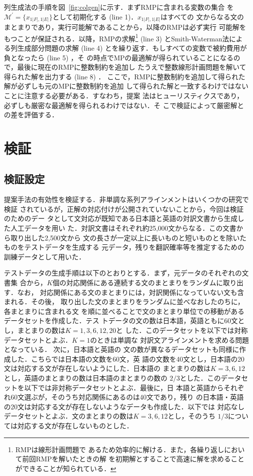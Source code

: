 \documentclass[japanese]{jnlp_1.4}
\begin{document}
列生成法の手順を図~\ref{fig:colgen}に示す．まずRMPに含まれる変数の集合
を$\mathcal{M}^{\prime} = \{x_{1|F|,1|E|}\}$として初期化する (line 1)．$x_{1|F|,1|E|}$はすべての
文からなる文のまとまりであり，実行可能解であることから，以降のRMPは必ず実行
可能解をもつことが保証される．以降，RMPの求解\footnote{RMPは線形計画問題で
あるため効率的に解ける．また，各繰り返しにおいて前回RMPを解いたときの解
を初期解とすることで高速に解を求めることができることが知られている．} (line 3)
とSmith-Waterman法による列生成部分問題の求解 (line 4) 
とを繰り返す．もしすべての変数で被約費用が負となったら (line 5) ，そ
の時点でMPの最適解が得られていることになるので，最後に現在のRMPに整数制約を追加し
たうえで整数線形計画問題を解いて得られた解を出力する (line 8) ．
ここで，RMPに整数制約を追加して得られた解が必ずしも元のMPに整数制約を追加
して得られた解と一致するわけではないことに注意する必要がある．すなわち，提案
法はヒューリスティクスであり，必ずしも厳密な最適解を得られるわけではない．そ
こで検証によって厳密解との差を評価する．


\section{検証}

\subsection{検証設定}

提案手法の有効性を検証する．非単調な系列アラインメントはいくつかの研究で検証
されているが，正解の対応付けが公開されていないことから，今回は検証のためのデー
タとして文対応が既知である日本語と英語の対訳文書から生成した人工データを用い
た．対訳文書はそれぞれ約25,000文からなる．この文書から取り出した2,500文から
文の長さが一定以上に長いものと短いものとを除いたものをテストデータを生成する
元データ，残りを翻訳確率等を推定するための訓練データとして用いた．

テストデータの生成手順は以下のとおりとする．まず，元データのそれぞれの文書集
合から，$K$個の対応関係にある連続する文のまとまりをランダムに取り出す．なお，
対応関係にある文のまとまりには，対訳関係になっていない文も含まれる．その後，
取り出した文のまとまりをランダムに並べなおしたのちに，各まとまりに含まれる文
を順に並べることで文のまとまり単位での移動があるデータセットを作成した．テス
トデータの文の数は日本語，英語ともに60文とし，まとまりの数は$K = 1, 3, 6,
12, 20$と
した．このデータセットを以下では対称データセットとよぶ．$K=1$のときは単調な
対訳文アラインメントを求める問題となっている．
次に，日本語と英語の
文の数が異なるデータセットも同様に作成した．こちらでは日本語の文数を60文，英
語の文数を40文とし，日本語の20文は対応する文が存在しないようにした．日本語の
まとまりの数は$K=3, 6, 12$とし，英語のまとまりの数は日本語のまとまりの数の
$2/3$とした．このデータセットを以下では非対称データセットとよぶ．最後に，日
本語と英語からそれぞれ60文選ぶが，そのうち対応関係にあるのは40文であり，残り
の日本語・英語の20文は対応する文が存在しないようなデータも作成した．以下では
対応なしデータセットとよぶ．文のまとまりの数は$K=3, 6, 12$とし，そのうち
$1/3$については対応する文が存在しないものとした．
\end{document}
